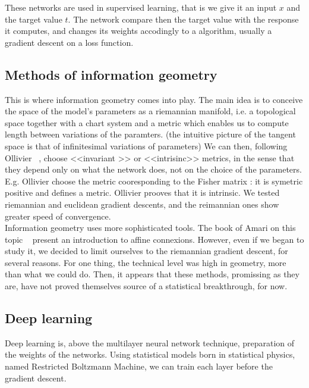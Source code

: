 \documentclass{article}
\begin{document}
These networks are used in supervised learning, that is we give it an input $x$ and the target value $t$. The network compare then the target value with the response it computes, and changes its weights accodingly to a algorithm, usually a gradient descent on a loss function.\\

\subsection{Methods of information geometry}

This is where information geometry comes into play. The main idea is to conceive the space of the model's parameters as a riemannian manifold, i.e. a topological space together with a chart system and a metric which enables us to compute length between variations of the paramters. (the intuitive picture of the tangent space is that of infinitesimal variations of parameters) We can then, following Ollivier ~\cite{Ollivier}, choose <<invariant >> or <<intrisinc>> metrics, in the sense that they depend only on what the network does, not on the choice of the parameters. E.g. Ollivier choose the metric cooresponding to the Fisher matrix : it is symetric positive and defines a metric. Ollivier prooves that it is intrinsic. We tested riemannian and euclidean gradient descents, and the reimannian ones show greater speed of convergence. \\

Information geometry uses more sophisticated tools. The book of Amari on this topic ~\cite{Amari} present an introduction to affine connexions. However, even if we began to study it, we decided to limit ourselves to the riemannian gradient descent, for several reasons. For one thing, the technical level was high in geometry, more than what we could do. Then, it appears that these methods, promissing as they are, have not proved themselves source of a statistical breakthrough, for now. \\

\subsection{Deep learning}

Deep learning is, above the multilayer neural network technique, preparation of the weights of the networks. Using statistical models born in statistical physics, named Restricted Boltzmann Machine, we can train each layer before the gradient descent.\\
\end{document}
